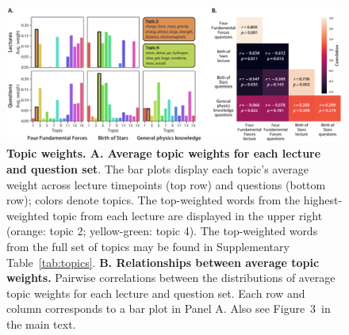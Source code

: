 \documentclass[10pt]{article}
\newcommand{\topicVariability}{3}
\begin{document}
\begin{figure}[tp]
    \includegraphics[width=\textwidth]{figs/topic-weights}

    \caption{\textbf{Topic weights. A. Average topic weights for each lecture and
    question set}. The bar plots display each topic's average weight across
    lecture timepoints (top row) and questions (bottom row); colors denote topics.
    The top-weighted words from the highest-weighted topic from each lecture are
    displayed in the upper right (orange: topic 2; yellow-green: topic 4). The
    top-weighted words from the full set of topics may be found in Supplementary
    Table~\ref{tab:topics}. \textbf{B. Relationships between average topic
    weights.} Pairwise correlations between the distributions of average topic
    weights for each lecture and question set. Each row and column corresponds
    to a bar plot in Panel A. Also see Figure~\topicVariability~in the main text.}

    \label{fig:topics}
\end{figure}


\newpage
\end{document}
